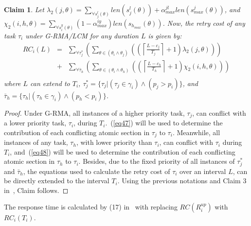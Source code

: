 \documentclass[conference]{IEEEtran}
\newtheorem{clm}{Claim}
\begin{document}
\begin{clm}\label{response g-rma/lcm}
Let $\lambda_{2}(j,\theta)=\sum_{\forall s_{j}^{l}(\theta)}len(s_{j}^{l}(\theta))+\alpha_{max}^{jl}len(s_{max}^{j}(\theta))$, and $\chi_{2}(i,h,\theta)=\sum_{\forall s_{i}^{y}(\theta)}(1-\alpha_{max}^{iy})len(s_{h_{max}}(\theta))$. Now, the retry cost of any task $\tau_i$ under G-RMA/LCM for any duration $L$ is given by:
\begin{eqnarray}
RC_i\left(L\right) & = &
  \sum_{\forall \tau_{j}^{*}}\left(\sum_{\theta\in(\theta_{i}\wedge\theta_{j})}\left(\left(\left\lceil\frac{L-c_{j}}{T_{j}}\right\rceil +1\right)\lambda_{2}(j,\theta)\right)\right)\nonumber\\
& + & \sum_{\forall\bar{\tau}_{h}}\left(\sum_{\theta\in(\theta_{i}\wedge\theta_{h})}\left(\left(\left\lceil\frac{L-c_{h}}{T_{h}}\right\rceil +1\right)\chi_{2}(i,h,\theta)\right)\right)\nonumber\\
\label{eq60}
\end{eqnarray}
where $L$ can extend to $T_{i}$, $\tau_{j}^{*}=\{\tau_{j}|(\tau_{j}\in\gamma_{i})\wedge(p_{j}>p_{i})\}$,
and $\bar{\tau}_{h}=\{\tau_{h}|(\tau_{h}\in\gamma_{i})\wedge(p_{h}<p_{i})\}$.
\end{clm}
\begin{proof}
Under G-RMA, all instances of a higher priority task, $\tau_{j}$, can conflict with a lower priority task,
$\tau_{i}$, during $T_{i}$.~(\ref{eq47}) will be used to determine the contribution of each conflicting atomic section in $\tau_j$ to $\tau_i$. Meanwhile, all instances of any task, $\tau_{h}$, with lower priority than $\tau_{i}$, can conflict with $\tau_i$ during $T_{i}$, and~(\ref{eq48}) will be used to determine the contribution of each conflicting atomic section in $\tau_h$ to $\tau_i$.
%
 Besides, due to the fixed priority of all instances of $\tau_j^*$ and $\bar{\tau}_h$, the equations used to calculate the retry cost of $\tau_{i}$ over an interval $L$, can be directly extended to the interval $T_{i}$. %
Using the previous notations and Claim 3 in~\cite{stmconcurrencycontrol:emsoft11}, Claim follows.
\end{proof}

The response time is calculated by (17) in~\cite{stmconcurrencycontrol:emsoft11} with replacing $RC(R_i^{up})$ with $RC_i(T_i)$.
\end{document}

